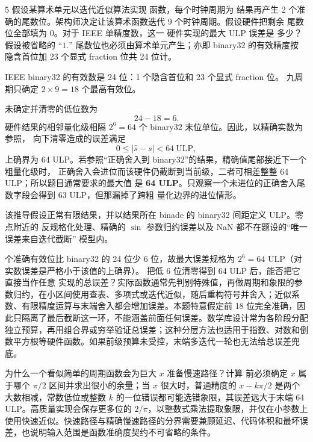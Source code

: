 \begin{solutionexercise}{5}
\problemheading 假设某算术单元以迭代近似算法实现  函数，每个时钟周期为
结果再产生 2 个准确的尾数位。架构师决定让该算术函数迭代 9 个时钟周期。假设硬件把剩余
尾数位全部填为 0。对于 IEEE 单精度数，这一  硬件实现的最大 ULP 误差是
多少？假设被省略的 ``$1.$'' 尾数位也必须由算术单元产生；亦即 binary32 的有效精度按
隐含首位加 23 个显式 fraction 位共 24 位计。

\approachheading IEEE binary32 的有效数是 24 位：1 个隐含首位和 23 个显式 fraction 位。
九周期只确定 $2\times9=18$ 个最高有效位。

\answerheading 未确定并清零的低位数为
\[
  24-18=6.
\]
硬件结果的相邻量化级相隔 $2^6=64$ 个 binary32 末位单位。因此，以精确实数为参照，
向下清零造成的误差满足
\[
  0\le |\widehat{s}-s|<64\ \mathrm{ULP},
\]
上确界为 64 ULP。若参照“正确舍入到 binary32”的结果，精确值尾部接近下一个粗量化级时，
正确舍入会进位而该硬件仍截断到当前级，二者可相差整整 64 ULP；所以题目通常要求的最大值
是 \textbf{64 ULP}。只观察一个未进位的正确舍入尾数字段会得到 63 ULP，但那漏掉了跨粗
量化边界的进位情形。

该推导假设正常有限结果，并以结果所在 binade 的 binary32 间距定义 ULP。零点附近的
反规格化处理、精确的 $\sin$ 参数归约误差以及 NaN 都不在题设的“唯一误差来自迭代截断”
模型内。

 个准确有效位比 binary32 的 24 位少 6 位，故最大误差规格为
$2^6=64$ ULP（对实数误差是严格小于该值的上确界）。
\discussionheading
{}
把低 6 位清零得到 64 ULP 后，能否把它直接当作任意  实现的总误差？实际函数通常先判别特殊值，再做周期和象限的参数归约，在小区间使用查表、多项式或迭代近似，随后重构符号并舍入；近似系数、有限精度运算与末端舍入都会增加误差。本题特意假定前 18 位完全准确，因此只隔离了最后截断这一环，不能涵盖前面任何误差。数学库设计常为各阶段分配独立预算，再用组合界或穷举验证总误差；这种分层方法也适用于指数、对数和倒数平方根等硬件函数。如果前级预算未受控，末端多迭代一轮也无法给总误差兜底。

为什么一个看似简单的周期函数会为巨大 $x$ 准备慢速路径？计算  前必须确定 $x$ 属于哪个 $\pi/2$ 区间并求出很小的余量；当 $x$ 很大时，普通精度的 $x-k\pi/2$ 是两个大数相减，常数低位或整数 $k$ 的一位错误都可能选错象限，其误差远大于末端 64 ULP。高质量实现会保存更多位的 $2/\pi$，以整数式乘法提取象限，并仅在小参数上使用快速近似。快速路径与精确慢速路径的分界需要兼顾延迟、代码体积和最坏误差，也说明输入范围是函数准确度契约不可省略的条件。


\end{solutionexercise}
